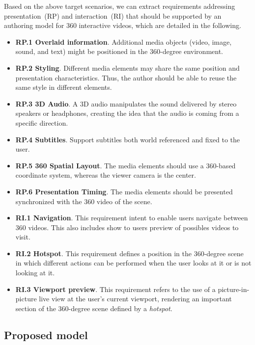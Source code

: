Based on the above target scenarios, we can extract requirements addressing
presentation~(RP) and interaction~(RI) that should be
supported by an authoring model for 360 interactive videos, which are detailed
in the following.

\begin{itemize}
    \item \textbf{RP.1 Overlaid information}. Additional media objects
      (video, image, sound, and text) might be positioned in the 360-degree
      environment.
   \item \textbf{RP.2 Styling}. Different media elements may share the same
      position and presentation characteristics.
      Thus, the author should be able to reuse the same style in different
      elements.
  \item \textbf{RP.3 3D Audio}. A 3D audio manipulates the sound delivered by
    stereo speakers or headphones, creating the idea that the audio is coming
    from a specific direction.
  \item \textbf{RP.4 Subtitles}. Support subtitles both world referenced and fixed to the user.
  \item \textbf{RP.5 360 Spatial Layout}. The media elements should use a
    360-based coordinate system, whereas the viewer camera is the center.
  \item \textbf{RP.6 Presentation Timing}. The media elements should be
    presented synchronized with the 360 video of the scene. 
  \item \textbf{RI.1 Navigation}. This requirement intent to enable users
    navigate between 360 videos. This also includes show to users preview of
    possibles videos to visit.
  \item \textbf{RI.2 Hotspot}. This requirement defines a position in the
    360-degree scene in which different actions can be performed when the user
    looks at it or is not looking at it.
  \item \textbf{RI.3 Viewport preview}. This requirement refers to the use of
    a picture-in-picture live view at the user's current viewport, rendering
    an important section of the 360-degree scene defined by a \emph{hotspot}.
\end{itemize}



\subsection{Proposed model}
\label{subsec:proposal}
 

